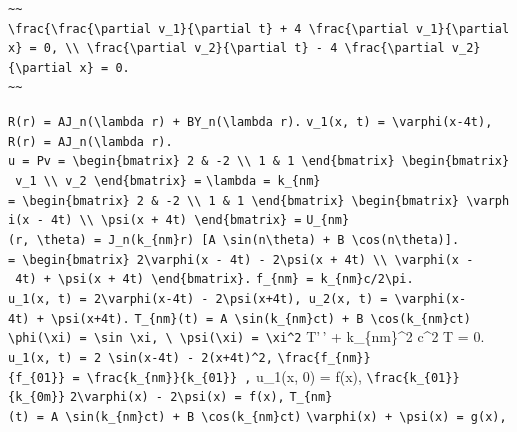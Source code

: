 \documentclass[
  ukrainian,
]{article}
\begin{document}
\begin{verbatim}
~~
\frac{\frac{\partial v_1}{\partial t} + 4 \frac{\partial v_1}{\partial x} = 0, \\ \frac{\partial v_2}{\partial t} - 4 \frac{\partial v_2}{\partial x} = 0.
~~
\end{verbatim}

\texttt{R(r)\ =\ AJ\_n(\textbackslash{}lambda\ r)\ +\ BY\_n(\textbackslash{}lambda\ r).}
\texttt{v\_1(x,\ t)\ =\ \textbackslash{}varphi(x-4t),}
\texttt{R(r)\ =\ AJ\_n(\textbackslash{}lambda\ r).}
\texttt{u\ =\ Pv\ =\ \textbackslash{}begin\{bmatrix\}\ 2\ \&\ -2\ \textbackslash{}\textbackslash{}\ 1\ \&\ 1\ \textbackslash{}end\{bmatrix\}\ \textbackslash{}begin\{bmatrix\}\ v\_1\ \textbackslash{}\textbackslash{}\ v\_2\ \textbackslash{}end\{bmatrix\}\ =}
\texttt{\textbackslash{}lambda\ =\ k\_\{nm\}}
\texttt{=\ \textbackslash{}begin\{bmatrix\}\ 2\ \&\ -2\ \textbackslash{}\textbackslash{}\ 1\ \&\ 1\ \textbackslash{}end\{bmatrix\}\ \textbackslash{}begin\{bmatrix\}\ \textbackslash{}varphi(x\ -\ 4t)\ \textbackslash{}\textbackslash{}\ \textbackslash{}psi(x\ +\ 4t)\ \textbackslash{}end\{bmatrix\}\ =}
\texttt{U\_\{nm\}(r,\ \textbackslash{}theta)\ =\ J\_n(k\_\{nm\}r)\ {[}A\ \textbackslash{}sin(n\textbackslash{}theta)\ +\ B\ \textbackslash{}cos(n\textbackslash{}theta){]}.}
\texttt{=\ \textbackslash{}begin\{bmatrix\}\ 2\textbackslash{}varphi(x\ -\ 4t)\ -\ 2\textbackslash{}psi(x\ +\ 4t)\ \textbackslash{}\textbackslash{}\ \textbackslash{}varphi(x\ -\ 4t)\ +\ \textbackslash{}psi(x\ +\ 4t)\ \textbackslash{}end\{bmatrix\}.}
\texttt{f\_\{nm\}\ =\ k\_\{nm\}c/2\textbackslash{}pi.}
\texttt{u\_1(x,\ t)\ =\ 2\textbackslash{}varphi(x-4t)\ -\ 2\textbackslash{}psi(x+4t),\ u\_2(x,\ t)\ =\ \textbackslash{}varphi(x-4t)\ +\ \textbackslash{}psi(x+4t).}
\texttt{T\_\{nm\}(t)\ =\ A\ \textbackslash{}sin(k\_\{nm\}ct)\ +\ B\ \textbackslash{}cos(k\_\{nm\}ct)}
\texttt{\textbackslash{}phi(\textbackslash{}xi)\ =\ \textbackslash{}sin\ \textbackslash{}xi,\ \textbackslash{}\ \textbackslash{}psi(\textbackslash{}xi)\ =\ \textbackslash{}xi\^{}2}
T'\,' + k\_\{nm\}\^{}2 c\^{}2 T = 0.
\texttt{u\_1(x,\ t)\ =\ 2\ \textbackslash{}sin(x-4t)\ -\ 2(x+4t)\^{}2,}
\texttt{\textbackslash{}frac\{f\_\{nm\}\}\{f\_\{01\}\}\ =\ \textbackslash{}frac\{k\_\{nm\}\}\{k\_\{01\}\}\ ,}
u\_1(x, 0) = f(x),
\texttt{\textbackslash{}frac\{k\_\{01\}\}\{k\_\{0m\}\}}
\texttt{2\textbackslash{}varphi(x)\ -\ 2\textbackslash{}psi(x)\ =\ f(x),}
\texttt{T\_\{nm\}(t)\ =\ A\ \textbackslash{}sin(k\_\{nm\}ct)\ +\ B\ \textbackslash{}cos(k\_\{nm\}ct)}
\texttt{\textbackslash{}varphi(x)\ +\ \textbackslash{}psi(x)\ =\ g(x),}
\end{document}
